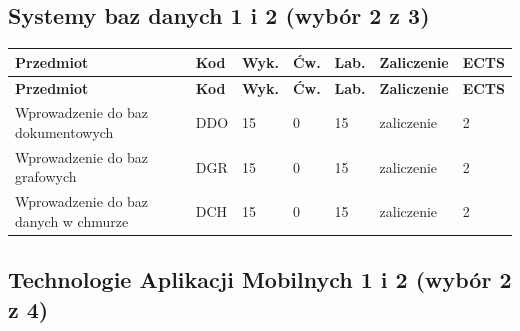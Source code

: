 \documentclass[12pt,a4paper]{article}
\newcommand{\thdrule}{\noalign{\global\setlength{\extrarowheight}{0pt}}}
\newcommand{\thdend}{\noalign{\global\setlength{\extrarowheight}{4pt}}}
\begin{document}
\subsection*{Systemy baz danych 1 i 2 (wybór 2 z 3)}

{\scriptsize
\begin{longtable}{m{5.5cm}m{0.8cm}m{1cm}m{1cm}m{1cm}m{1.7cm}m{0.7cm}}
\thdrule\toprule
\rowcolor{pjatkRed}
{\color{white}\footnotesize\textbf{\vphantom{Ag}Przedmiot}} & {\color{white}\footnotesize\textbf{\vphantom{Ag}Kod}} & {\color{white}\footnotesize\textbf{\vphantom{Ag}Wyk.}} & {\color{white}\footnotesize\textbf{\vphantom{Ag}Ćw.}} & {\color{white}\footnotesize\textbf{\vphantom{Ag}Lab.}} & {\color{white}\footnotesize\textbf{\vphantom{Ag}Zaliczenie}} & {\color{white}\footnotesize\textbf{\vphantom{Ag}ECTS}} \\
\midrule\thdend
\endfirsthead
\thdrule\toprule
\rowcolor{pjatkRed}
{\color{white}\footnotesize\textbf{\vphantom{Ag}Przedmiot}} & {\color{white}\footnotesize\textbf{\vphantom{Ag}Kod}} & {\color{white}\footnotesize\textbf{\vphantom{Ag}Wyk.}} & {\color{white}\footnotesize\textbf{\vphantom{Ag}Ćw.}} & {\color{white}\footnotesize\textbf{\vphantom{Ag}Lab.}} & {\color{white}\footnotesize\textbf{\vphantom{Ag}Zaliczenie}} & {\color{white}\footnotesize\textbf{\vphantom{Ag}ECTS}} \\
\midrule\thdend
\endhead
\rowcolor{tableRowLight} Wprowadzenie do baz dokumentowych & DDO & 15 & 0 & 15 & {\scriptsize zaliczenie} & 2 \\
\rowcolor{tableRowAlt} Wprowadzenie do baz grafowych & DGR & 15 & 0 & 15 & {\scriptsize zaliczenie} & 2 \\
\rowcolor{tableRowLight} Wprowadzenie do baz danych w chmurze & DCH & 15 & 0 & 15 & {\scriptsize zaliczenie} & 2 \\
\bottomrule
\end{longtable}}

\subsection*{Technologie Aplikacji Mobilnych 1 i 2 (wybór 2 z 4)}
\end{document}

